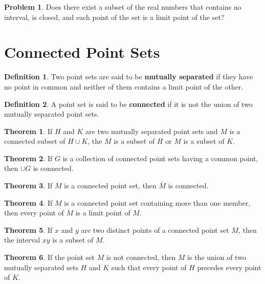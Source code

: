 \documentclass{article}
\theoremstyle{definition}
\newtheorem{definition}{Definition}
\newtheorem{theorem}{Theorem}
\theoremstyle{definition}
\newtheorem{problem}{Problem}
\theoremstyle{plain}
\begin{document}
\begin{problem}
  Does there exist a subset of the real numbers that contains no interval, is
  closed, and each point of the set is a limit point of the set?
\end{problem}

\section*{Connected Point Sets}

\begin{definition}
  Two point sets are said to be \textbf{mutually separated} if they have no
  point in common and neither of them contains a limit point of the other.
\end{definition}

\begin{definition}
  A point set is said to be \textbf{connected} if it is not the union of two
  mutually separated point sets.
\end{definition}

\begin{theorem}
  If $H$ and $K$ are two mutually separated point sets and $M$ is a connected
  subset of $H \cup K$, the $M$ is a subset of $H$ or $M$ is a subset of $K$.
\end{theorem}

\begin{theorem}
  If $G$ is a collection of connected point sets having a common point, then
  $\cup G$ is connected.
\end{theorem}

\begin{theorem}
  If $M$ is a connected point set, then $\bar{M}$ is
  connected.
\end{theorem}

\begin{theorem}
  If $M$ is a connected point set containing more than one member, then every
  point of $M$ is a limit point of $M$.
\end{theorem}

\begin{theorem}
  If $x$ and $y$ are two distinct points of a connected
  point set $M$, then the interval $xy$ is a subset of $M$.
\end{theorem}

\begin{theorem}
  If the point set $M$ is not connected, then $M$ is the
  union of two mutually separated sets $H$ and $K$ such that every point of $H$
  precedes every point of $K$.
\end{theorem}
\end{document}
